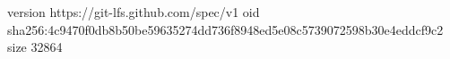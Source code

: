 version https://git-lfs.github.com/spec/v1
oid sha256:4c9470f0db8b50be59635274dd736f8948ed5e08c5739072598b30e4eddcf9c2
size 32864
